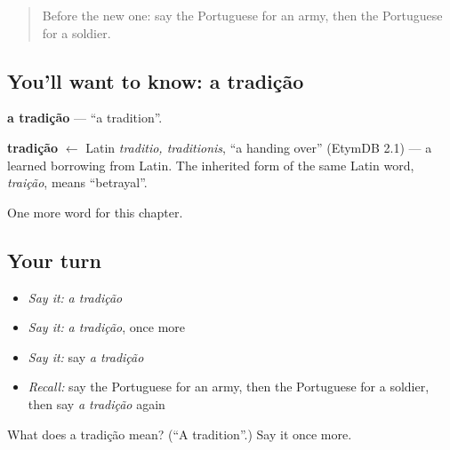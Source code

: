 \begin{quote}
Before the new one: say the Portuguese for an army, then the Portuguese for a soldier.
\end{quote}

\subsection*{You'll want to know: a tradição}
\textbf{a tradição} — \textquotedblleft{}a tradition\textquotedblright{}.

\begin{cousinweb}
\textbf{tradição} $\leftarrow$ Latin \emph{traditio, traditionis}, \textquotedblleft{}a handing over\textquotedblright{} (EtymDB 2.1) — a learned borrowing from Latin. The inherited form of the same Latin word, \emph{traição}, means \textquotedblleft{}betrayal\textquotedblright{}.
\end{cousinweb}

\begin{grammarlens}[title={What you've built}]
One more word for this chapter.
\end{grammarlens}

\subsection*{Your turn}
\begin{itemize}
\raggedright
  \item \emph{Say it:} \emph{a tradição}
  \item \emph{Say it:} \emph{a tradição}, once more
  \item \emph{Say it:} say \emph{a tradição}
  \item \emph{Recall:} say the Portuguese for an army, then the Portuguese for a soldier, then say \emph{a tradição} again
\end{itemize}

\begin{tcolorbox}[breakable,colback=teal!4,colframe=teal!35!black,title={Before you move on}]
What does a tradição mean? (\textquotedblleft{}A tradition\textquotedblright{}.) Say it once more.
\end{tcolorbox}
